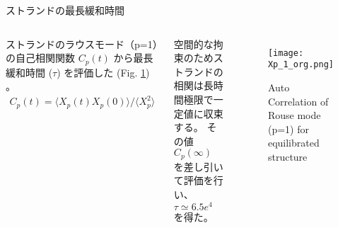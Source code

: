 \begin{columns}[totalwidth=.85\linewidth]
		\begin{itembox}[l]{ストランドの最長緩和時間}
			\begin{columns}[totalwidth=\linewidth]
				ストランドのラウスモード（p=1）の自己相関関数 $C_p(t)$ から最長緩和時間 ($\tau$) を評価した (Fig. \ref{ac-xp}) 。
				\begin{align*}
					C_p(t) = \langle X_p(t)X_p(0) \rangle/\langle X_p^2 \rangle
				\end{align*}
				
				空間的な拘束のためストランドの相関は長時間極限で一定値に収束する。
				その値 $C_p(\infty)$ を差し引いて評価を行い、$\tau \simeq 6.5e^{4}$ を得た。
				
				\begin{figure}[htb]
					\centering
						\texttt{[image: Xp\_1\_org.png]}
						\caption{Auto Correlation of Rouse mode (p=1) for equilibrated structure}
						\label{ac-xp}
				\end{figure}
				\end{columns}
		\end{itembox}

\end{columns}